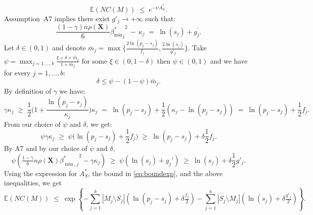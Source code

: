 \documentclass[aos]{imsart}
\theoremstyle{plain}
\newcommand{\E}{\mathbb{E}}
\newcommand{\bs}{\boldsymbol}
\begin{document}
\begin{equation}\label{eq:boundexp}
    \E(NC(M))\;\leq\;e^{-\psi A_S^*}.
\end{equation}
Assumption~A7 implies there exist $g'_j \to +\infty$ such that:
$$\frac{(1-\gamma) n\rho(\bs X)}{6}{{\beta_{\min}^*}_j}^2 \,- \,\kappa_j \;=\; \ln(s_j) + g^{\prime}_{j}.$$
Let $\delta \in (0,1)$ and denote $\bar{m}_j=\max\big\{\frac{2\ln(p_j-s_j)}{f_j},\frac{2\ln(s_j)}{g'_{j}}\big\}$. Take $\psi=\max_{j=1,\ldots,b}\frac{\xi + \delta + \bar{m}_j}{1+\bar{m}_j}$ for some $\xi \in(0, 1- \delta)$ then $\psi \in (0,1)$ and we have for every $j=1,\ldots,b$:
$$\delta \leq \psi-(1-\psi)\bar{m}_j.$$ 
By definition of $\gamma$ we have: 
$$
\gamma\kappa_j\;\geq\;\frac12 \Big(1+\frac{\ln(p_j-s_j)}{\kappa_j}\Big)\kappa_j\;=\;\ln(p_j-s_j)+\frac12(\kappa_j-\ln(p_j-s_j)) \;=\; \ln(p_j-s_j)+ \frac12f_j.
$$
From our choice of $\psi$ and $\delta$, we get:
$$\psi\gamma\kappa_j \;\geq\; \psi\big(\ln(p_j-s_j)+ \frac12f_j\big) \;\geq\;  \ln(p_j-s_j)+ \delta\frac12f_j.$$
By A7 and by our choice of $\psi$ and $\delta$,
$$\psi\left(\tfrac{1-\gamma}{6} n \rho(\bs X) {\beta^*_{\min,j}}^{2} - \gamma\kappa_j\right) \;\geq\; \psi\left(\ln(s_j)+g_j'\right) \;\geq\; \ln(s_j)+\delta \frac{1}{2}g'_j.
$$
Using the expression for $A_S^*$, the bound in \eqref{eq:boundexp}, and the above inequalities, we get
$$
\E(NC(M))\;\leq\;\exp\left\{- \sum_{j=1}^b |M_j\setminus S_j|(\ln(p_j-s_j)+\delta \tfrac{f_j}{2})-\sum_{j=1}^b |S_j\setminus M_j|(\ln(s_j)+\delta \tfrac{g'_j}{2})\right\}.
$$
\end{document}
